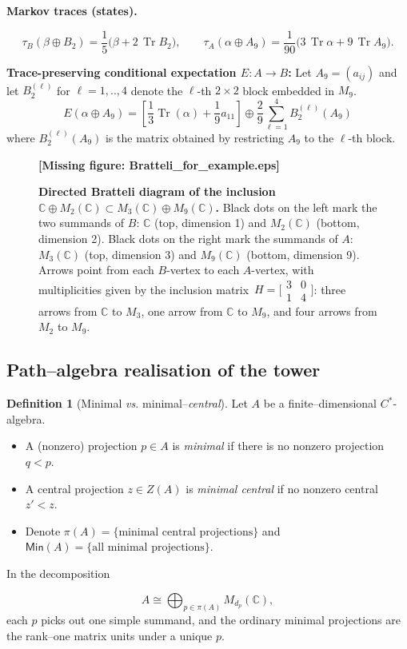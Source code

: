 \documentclass[11pt]{article}
\theoremstyle{mytheoremstyle}
\theoremstyle{definition}
\newtheorem{definition}[theorem]{\color{MyDarkBlue}Definition}
\theoremstyle{remark}
\DeclareMathOperator{\Tr}{Tr}
\newcommand{\bbC}{\mathbb{C}}
\newcommand{\Cst}{$C^{*}$}
\newcommand{\missingfigure}[1]{{\color{MyRed} \bfseries [Missing figure: #1]}}
\begin{document}
\textbf{Markov traces (states).}

\[
  \tau_B(\beta\oplus B_2)=\frac15\!\bigl(\beta+2\,\Tr B_2\bigr), \qquad
  \tau_A(\alpha\oplus A_9)=\frac1{90}\bigl(3\,\Tr\alpha+9\,\Tr A_9\bigr).
\]

\textbf{Trace-preserving conditional expectation \(E:A\to B\):}
Let $A_9 = (a_{ij})$ and let $B_2^{(\ell)}$ for $\ell=1,..,4$ denote the $\ell$-th $2 \times 2$ block embedded in $M_9$.
\[
  E(\alpha\oplus A_{9})=
  \left[\frac{1}{3}\Tr(\alpha) + \frac{1}{9} a_{11}\right]
  \oplus 
  \frac{2}{9} \sum_{\ell=1}^4 B_2^{(\ell)}(A_9)
\]
where $B_2^{(\ell)}(A_9)$ is the matrix obtained by restricting $A_9$ to the $\ell$-th block.

\begin{figure}[ht]
  \centering
  \missingfigure{Bratteli_for_example.eps}
  \caption[Directed Bratteli diagram for $\bbC\oplus M_{2}\subset M_{3}\oplus M_{9}$] { \small\textbf{Directed Bratteli diagram of the inclusion
\(\bbC\oplus M_{2}(\mathbb{C})\subset M_{3}(\mathbb{C})\oplus M_{9}(\mathbb{C})\).}
Black dots on the left mark the two summands of \(B\):
\(\bbC\) (top, dimension 1) and \(M_{2}(\mathbb{C})\) (bottom, dimension 2).
Black dots on the right mark the summands of \(A\):
\(M_{3}(\mathbb{C})\) (top, dimension 3) and \(M_{9}(\mathbb{C})\) (bottom, dimension 9).
Arrows point from each \(B\)-vertex to each \(A\)-vertex, with multiplicities
given by the inclusion matrix
\(\,H=\bigl[\!\begin{smallmatrix}3&0\\
1&4\end{smallmatrix}\bigr]\): 
three arrows from \(\bbC\) to \(M_{3}\), one arrow from \(\bbC\) to \(M_{9}\),
and four arrows from \(M_{2}\) to \(M_{9}\).
}
  \label{fig:Bratteli-2x2}
\end{figure}


\newpage
\subsection{Path–algebra realisation of the tower}

\begin{definition}[Minimal \emph{vs.} minimal–\emph{central}]\label{def:min-vs-central}
Let \(A\) be a finite–dimensional \Cst-algebra.
\begin{itemize}[leftmargin=2em]
  \item A (nonzero) projection \(p\in A\) is \emph{minimal} if there is no nonzero projection \(q<p\).
  \item A central projection \(z\in Z(A)\) is \emph{minimal central} if no nonzero central \(z'<z\).
  \item Denote \(\pi(A)=\{\text{minimal central projections}\}\) and
        \(\mathsf{Min}(A)=\{\text{all minimal projections}\}\).
\end{itemize}
In the decomposition

\[
  A\cong\bigoplus_{p\in\pi(A)}M_{d_p}(\bbC),
\]
each \(p\) picks out one simple summand, and the ordinary minimal projections
are the rank–one matrix units under a unique \(p\).
\end{definition}
\end{document}
